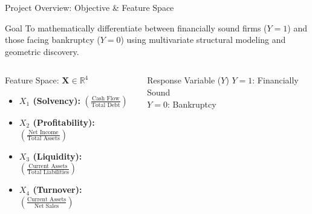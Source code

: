 \documentclass[8pt, aspectratio=169]{beamer}
\begin{document}
\begin{frame}{Project Overview: Objective \& Feature Space}
    \begin{block}{Goal}
        \small To mathematically differentiate between financially sound firms ($Y=1$) and those facing bankruptcy ($Y=0$) using multivariate structural modeling and geometric discovery.
    \end{block}

    \vspace{0.2cm}

    \begin{columns}[T]
        \begin{exampleblock}{Feature Space: $\mathbf{X} \in \mathbb{R}^4$}
            \scriptsize
            \begin{itemize}
                \item \textbf{$X_1$ (Solvency):} $\left(\frac{\text{Cash Flow}}{\text{Total Debt}}\right)$
                \vspace{0.1cm}
                \item \textbf{$X_2$ (Profitability):} $\left(\frac{\text{Net Income}}{\text{Total Assets}}\right)$
                \vspace{0.1cm}
                \item \textbf{$X_3$ (Liquidity):} $\left(\frac{\text{Current Assets}}{\text{Total Liabilities}}\right)$
                \vspace{0.1cm}
                \item \textbf{$X_4$ (Turnover):} $\left(\frac{\text{Current Assets}}{\text{Net Sales}}\right)$
            \end{itemize}
        \end{exampleblock}

        \begin{alertblock}{Response Variable ($Y$)}
            \centering
            $Y = 1$: Financially Sound \\
            $Y = 0$: Bankruptcy
        \end{alertblock}

       
    \end{columns}
\end{frame}
\end{document}

